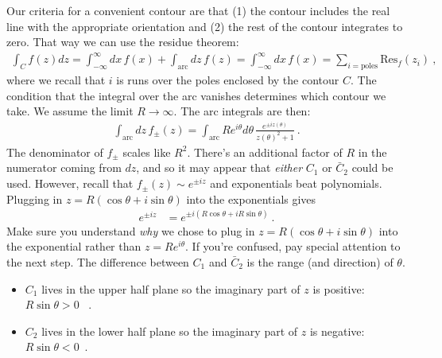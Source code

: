 \documentclass[
  11pt,
	colorful,
	raggedright,
]{tufte-style-thesis-flip}
\begin{document}
Our criteria for a convenient contour are that (1) the contour includes the real line with the appropriate orientation and (2) the rest of the contour integrates to zero. That way we can use the residue theorem:
\begin{align}
  \int_C f(z) dz 
  = \int_{-\infty}^\infty dx\, f(x)
  + \int_{\text{arc}}dz\, f(z) = 
  \int_{-\infty}^\infty dx\, f(x)
  = \sum_{i=\text{poles}}\text{Res}_f(z_i) \ ,
\end{align}
where we recall that $i$ is runs over the poles enclosed by the contour $C$. The condition that the integral over the arc vanishes determines which contour we take.
We assume the limit $R\to \infty$. The arc integrals are then:
\begin{align}
  \int_{\text{arc}}
  dz \, 
  f_\pm(z)
  =
  \int_\text{arc}
  Re^{i\theta}
  d\theta \, 
  \frac{e^{\pm iz(\theta)}}{z(\theta)^2+1}
  \ .
\end{align}
The denominator of $f_\pm$ scales like $R^2$. There's an additional factor of $R$ in the numerator coming from $dz$, and so it may  appear that \emph{either} $C_1$ or $\bar C_2$ could be used. However, recall that $f_{\pm}(z)\sim e^{\pm iz}$ and exponentials beat polynomials. Plugging in $z = R(\cos\theta + i \sin\theta)$ into the exponentials gives
\begin{align}
  e^{\pm iz} &= e^{\pm i\left(R\cos\theta + i R\sin\theta\right)} \ .
\end{align}
Make sure you understand \emph{why} we chose to plug in $z = R(\cos\theta + i \sin\theta)$ into the exponential rather than $z = Re^{i\theta}$. If you're confused, pay special attention to the next step. The difference between $C_1$ and $\bar C_2$ is the range (and direction) of $\theta$. 
\begin{itemize}
  \item $C_1$ lives in the upper half plane so the imaginary part of $z$ is positive: $R\sin\theta > 0$ \ .
  \item $C_2$ lives in the lower half plane so the imaginary part of $z$ is negative: $R\sin\theta < 0$\ .  
\end{itemize}
\end{document}
